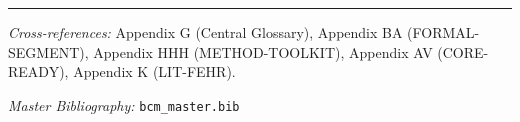 
\vspace{1em}
\hrule
\vspace{0.5em}

\noindent\textit{Cross-references:}
Appendix G (Central Glossary),
Appendix BA (FORMAL-SEGMENT),
Appendix HHH (METHOD-TOOLKIT),
Appendix AV (CORE-READY),
Appendix K (LIT-FEHR).

\noindent\textit{Master Bibliography:} \texttt{bcm\_master.bib}

